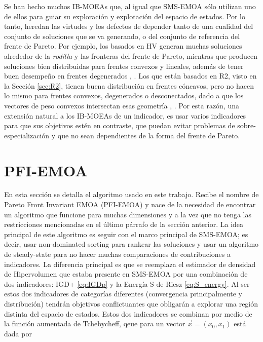 Se han hecho muchos IB-MOEAs que, al igual que SMS-EMOA sólo utilizan uno de ellos para guiar su exploración y explotación del espacio de estados. Por lo tanto, heredan las virtudes y los defectos de depender tanto de una cualidad del conjunto de soluciones que se va generando, o del conjunto de referencia del frente de Pareto. Por ejemplo, los basados en HV generan muchas soluciones alrededor de la \emph{rodilla} y las fronteras del frente de Pareto, mientras que producen soluciones bien distribuidas para frentes convexos y lineales, además de tener buen desempeño en frentes degenerados \cite{HV_reference}, \cite{SMS-EMOA}. Los que están basados en R2, visto en la Sección \ref{sec:R2}, tienen buena distribución en frentes cóncavos, pero no hacen lo mismo para frentes convexos, degenerados o desconectados, dado a que los vectores de peso convexos intersectan esas geometría \cite{performance_pareto_front}, \cite{R2-EMOA}. Por esta razón, una extensión natural a los IB-MOEAs de un indicador, es usar varios indicadores para que sus objetivos estén en contraste, que puedan evitar problemas de sobre-especialización y que no sean dependientes de la forma del frente de Pareto.  

\section{PFI-EMOA} \label{sec:PFI-EMOA}

En esta sección se detalla el algoritmo usado en este trabajo. Recibe el nombre de Pareto Front Invariant EMOA (PFI-EMOA) y nace de la necesidad de encontrar un algoritmo que funcione para muchas dimensiones y a la vez que no tenga las restricciones mencionadas en el último párrafo de la sección anterior. La idea principal de este algoritmo es seguir con el marco principal de SMS-EMOA; es decir, usar non-dominated sorting para rankear las soluciones y usar un algoritmo de steady-state para no hacer muchas comparaciones de contribuciones a indicadores. La diferencia principal es que se reemplaza el estimador de densidad de Hipervolumen que estaba presente en SMS-EMOA por una combinación de dos indicadores: IGD+ \eqref{eq:IGDp} y la Energía-S de Riesz \eqref{eq:S_energy}. Al ser estos dos indicadores de categorías diferentes (convergencia principalmente y distribución) tendrán objetivos conflictuantes que obligarán a explorar una región distinta del espacio de estados. Estos dos indicadores se combinan por medio de la función aumentada de Tchebycheff,  qeue para un vector $\vec{x}=(x_0,x_1)$ está dada por



